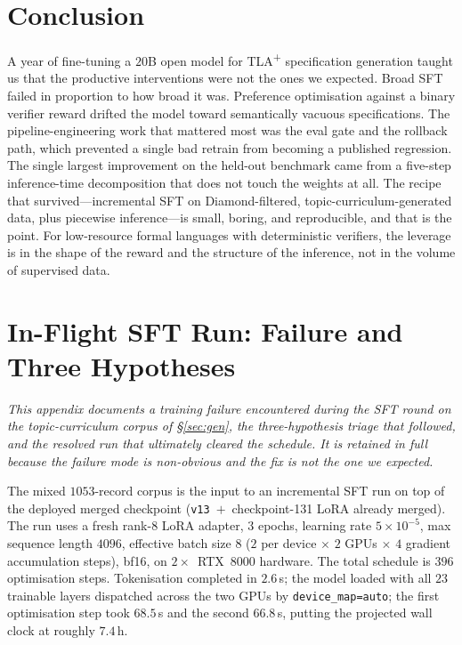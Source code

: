 \documentclass[11pt]{article}
\begin{document}
\section{Conclusion}
\label{sec:conclusion}

A year of fine-tuning a $20$B open model for TLA\textsuperscript{+}
specification generation taught us that the productive interventions
were not the ones we expected. Broad SFT failed in proportion to how
broad it was. Preference optimisation against a binary verifier reward
drifted the model toward semantically vacuous specifications. The
pipeline-engineering work that mattered most was the eval gate and the
rollback path, which prevented a single bad retrain from becoming a
published regression. The single largest improvement on the held-out
benchmark came from a five-step inference-time decomposition that does
not touch the weights at all. The recipe that survived---incremental
SFT on Diamond-filtered, topic-curriculum-generated data, plus
piecewise inference---is small, boring, and reproducible, and that is
the point. For low-resource formal languages with deterministic
verifiers, the leverage is in the shape of the reward and the
structure of the inference, not in the volume of supervised data.

\appendix

\section{In-Flight SFT Run: Failure and Three Hypotheses}
\label{sec:sftv3}

\noindent\textit{This appendix documents a training failure
encountered during the SFT round on the topic-curriculum corpus of
\S\ref{sec:gen}, the three-hypothesis triage that followed, and the
resolved run that ultimately cleared the schedule. It is retained in
full because the failure mode is non-obvious and the fix is not the
one we expected.}\medskip

The mixed $1053$-record corpus is the input to an incremental SFT run
on top of the deployed merged checkpoint
(\texttt{v13}~$+$~checkpoint-131 LoRA already merged). The run uses a
fresh rank-$8$ LoRA adapter, $3$ epochs, learning rate
$5\!\times\!10^{-5}$, max sequence length $4096$, effective batch size
$8$ ($2$ per device $\times$ $2$ GPUs $\times$ $4$ gradient
accumulation steps), bf16, on $2{\times}$~RTX~8000 hardware. The total
schedule is $396$ optimisation steps. Tokenisation completed in
$2.6$\,s; the model loaded with all $23$ trainable layers dispatched
across the two GPUs by \texttt{device\_map=auto}; the first
optimisation step took $68.5$\,s and the second $66.8$\,s, putting
the projected wall clock at roughly $7.4$\,h.
\end{document}
